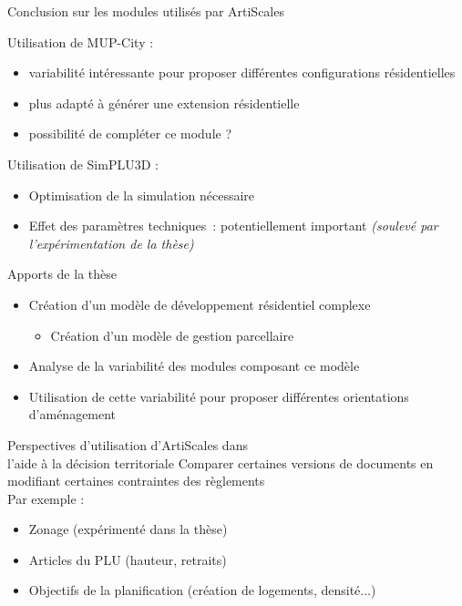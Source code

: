 \documentclass[xcolor=table]{beamer}
\begin{document}
\begin{frame}{Conclusion sur les modules utilisés par ArtiScales}
	\begin{block}{Utilisation de MUP-City :}
		\begin{itemize}
			\item variabilité intéressante pour proposer différentes configurations résidentielles
			\item plus adapté à générer une extension résidentielle
			\item possibilité de compléter ce module ? 			
		\end{itemize}
	\end{block}
	\begin{block}{Utilisation de SimPLU3D :}
		\begin{itemize}
			\item Optimisation de la simulation nécessaire
			\item Effet des paramètres techniques~: potentiellement important \textit{(soulevé par l'expérimentation de la thèse)}	\end{itemize}	
		\end{block}
\end{frame}
\begin{frame}{Apports de la thèse}
	\begin{itemize}
		\item Création d'un modèle de développement résidentiel complexe
		\begin{itemize}
			\item Création d'un modèle de gestion parcellaire
		\end{itemize}
		\item Analyse de la variabilité des modules composant ce modèle
		\item Utilisation de cette variabilité pour proposer différentes orientations d'aménagement
	\end{itemize}
\end{frame}

\begin{frame}{Perspectives d'utilisation d'ArtiScales dans \\l'aide à la décision territoriale}
	Comparer certaines versions de documents en modifiant certaines contraintes des règlements
	\\
	Par exemple : 
	\begin{itemize}
		\item Zonage (expérimenté dans la thèse)
		\item Articles du PLU (hauteur, retraits)
		\item Objectifs de la planification (création de logements, densité...)
	\end{itemize}
\end{frame}
\end{document}
